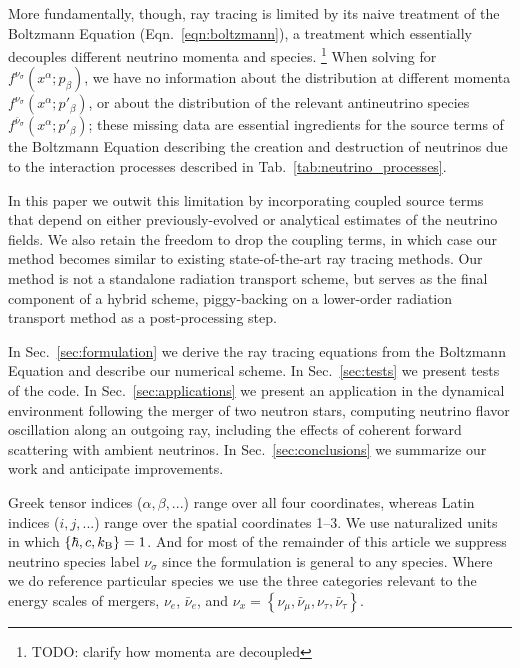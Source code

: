 \documentclass[aps,floatfix,prd,superscriptaddress,twocolumn]{revtex4-1}
\begin{document}
More fundamentally, though, ray tracing is limited by its naive
treatment of the Boltzmann Equation (Eqn.~\ref{eqn:boltzmann}),
a treatment which essentially decouples different neutrino momenta and species.
\footnote{TODO: clarify how momenta are decoupled}
When solving for $f^{\nu_\sigma}(x^\alpha;p_\beta)$,
we have no information about the distribution at different momenta
$f^{\nu_\sigma}(x^\alpha;p'_\beta)$,
or about the distribution of the relevant antineutrino species
$f^{\bar{\nu}_\sigma}(x^\alpha;p'_\beta)$;
these missing data are essential ingredients
for the source terms of the Boltzmann Equation describing the creation and
destruction of neutrinos due to the interaction processes described in
Tab.~\ref{tab:neutrino_processes}.

In this paper we outwit this limitation by incorporating coupled source terms
that depend on either previously-evolved or analytical
estimates of the neutrino fields.
We also retain the freedom to drop the coupling terms, in which case our method
becomes similar to existing state-of-the-art ray tracing methods.
Our method is not a standalone radiation transport scheme,
but serves as the final component of a hybrid scheme,
piggy-backing on a lower-order radiation transport method as a
post-processing step.

In Sec.~\ref{sec:formulation} we derive the ray tracing equations from the
Boltzmann Equation and describe our numerical scheme.
In Sec.~\ref{sec:tests} we present tests of the code.
In Sec.~\ref{sec:applications} we present an application
in the dynamical environment following the merger of two neutron stars,
computing neutrino flavor oscillation along an outgoing ray,
including the effects of coherent forward scattering with ambient neutrinos.
In Sec.~\ref{sec:conclusions} we summarize our work and anticipate improvements.

Greek tensor indices ($\alpha, \beta, ...$) range over all four coordinates,
whereas Latin indices ($i, j, ...$) range over the spatial coordinates 1--3.
We use naturalized units in which $\{\hbar,c,k_{\rm B}\}=1$.
And for most of the remainder of this article we suppress neutrino species label
$\nu_\sigma$ since the formulation is general to any species.
Where we do reference particular species we use the three categories
relevant to the energy scales of mergers, $\nu_e$, $\bar{\nu}_e$, and
$\nu_x=\left\{\nu_\mu,\bar{\nu}_\mu,\nu_\tau,\bar{\nu}_\tau\right\}$.
\end{document}

